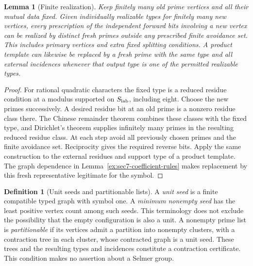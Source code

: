 \documentclass[11pt]{article}
\newtheorem{lemma}[theorem]{Lemma}
\theoremstyle{definition}
\newtheorem{definition}[theorem]{Definition}
\theoremstyle{remark}
\begin{document}
\begin{lemma}[Finite realization]\label{ex:sec7-realization}
Keep finitely many old prime vertices and all their mutual data fixed.
Given individually realizable types for finitely many new vertices,
every prescription of the independent forward bits involving a new
vertex can be realized by distinct fresh primes outside any prescribed
finite avoidance set. This includes primary vertices and extra fixed
splitting conditions. A product template can likewise be replaced by
a fresh prime with the same type and all external incidences whenever
that output type is one of the permitted realizable types.
\end{lemma}
\begin{proof}\leavevmode
For rational quadratic characters the fixed type is a reduced residue
condition at a modulus supported on $S_{\rm lab}$, including eight. Choose the
new primes successively. A desired residue bit at an old prime is a
nonzero residue class there. The Chinese remainder theorem combines
these classes with the fixed type, and Dirichlet's theorem supplies
infinitely many primes in the resulting reduced residue class.
At each step avoid all previously chosen primes and the finite
avoidance set. Reciprocity gives the required reverse bits. Apply
the same construction to the external residues and support type of
a product template. The graph dependence in
Lemma~\ref{ex:sec7-coefficient-rules} makes replacement by this fresh
representative legitimate for the symbol.
\end{proof}

\begin{definition}[Unit seeds and partitionable lists]\label{ex:sec7-seed-partition}
A \emph{unit seed} is a finite compatible typed graph with symbol
one. A \emph{minimum nonempty seed} has the least positive vertex
count among such seeds. This terminology does not exclude the
possibility that the empty configuration is also a unit.
A nonempty prime list is \emph{partitionable} if its vertices admit
a partition into nonempty clusters, with a contraction tree in each
cluster, whose contracted graph is a unit seed. These trees and the
resulting types and incidences constitute a contraction certificate.
This condition makes no assertion about a Selmer group.
\end{definition}
\end{document}
